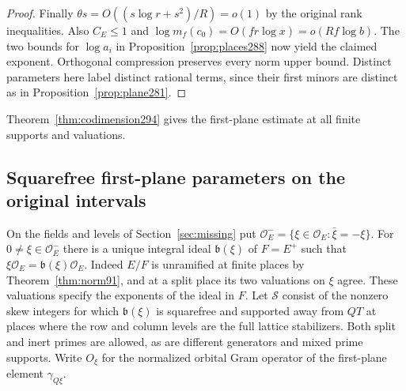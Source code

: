 \documentclass[a4paper,11pt]{article}
\theoremstyle{definition}
\theoremstyle{remark}
\numberwithin{equation}{section}
\begin{document}
\begin{proof}
Finally \(\theta s=O((s\log r+s^2)/R)=o(1)\) by the
original rank inequalities. Also \(C_E\le1\) and
\(\log m_f(c_0)=O(fr\log x)=o(Rf\log b)\).
The two bounds for \(\log a_i\) in
Proposition~\ref{prop:places288} now yield the claimed
exponent. Orthogonal compression preserves every norm
upper bound. Distinct parameters here label distinct
rational terms, since their first minors are distinct
as in Proposition~\ref{prop:plane281}.
\end{proof}

Theorem~\ref{thm:codimension294} gives the first-plane estimate at all finite supports and valuations.

\subsection{Squarefree first-plane parameters on the original intervals}\label{nav:I-69}
On the fields and levels of Section~\ref{sec:missing} put
\(\mathcal O_E^-=\{\xi\in\mathcal O_E:\bar\xi=-\xi\}\).
For \(0\ne\xi\in\mathcal O_E^-\) there is a unique integral
ideal \(\mathfrak b(\xi)\) of \(F=E^+\) such that
\(\xi\mathcal O_E=\mathfrak b(\xi)\mathcal O_E\).
Indeed \(E/F\) is unramified at finite places by
Theorem~\ref{thm:norm91}, and at a split place its two
valuations on \(\xi\) agree. These valuations specify
the exponents of the ideal in \(F\). Let \(\mathcal S\)
consist of the nonzero skew integers for which
\(\mathfrak b(\xi)\) is squarefree and supported away from
\(QT\) at places where the row and column levels are the
full lattice stabilizers. Both split and inert primes are
allowed, as are different generators and mixed prime supports.
Write \(O_\xi\) for the normalized orbital Gram operator of
the first-plane element \(\gamma_{Q\xi}\).
\end{document}

